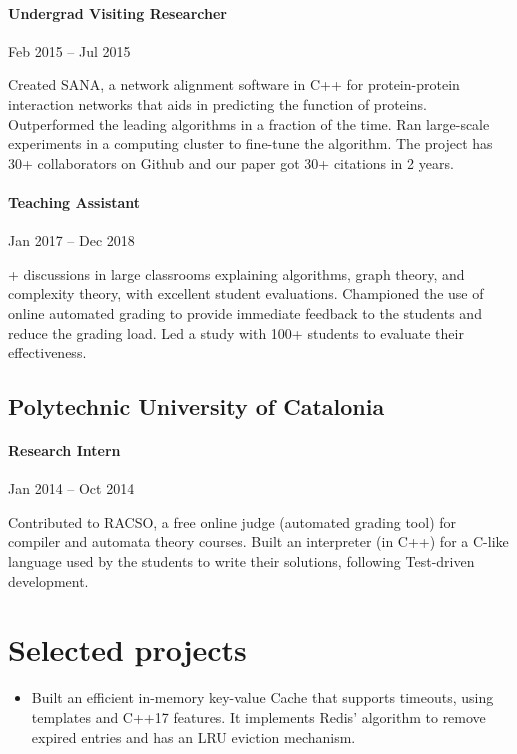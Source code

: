 \documentclass[letterpaper,10pt,oneside]{article}
\begin{document}
\paragraph*{Undergrad Visiting Researcher} \hfill Feb 2015 -- Jul 2015

\vspace{2px}
\noindent Created SANA, a network alignment software in C++ for protein-protein interaction networks that aids in predicting the function of proteins. Outperformed the leading algorithms in a fraction of the time. Ran
	large-scale experiments in a computing cluster to fine-tune the algorithm.
	The project has 30+ collaborators on Github and our paper got 30+ citations in 2 years.	
	 
\paragraph*{Teaching Assistant} \hfill Jan 2017 -- Dec 2018

\vspace{2px}
+ discussions in large classrooms explaining algorithms, graph theory, and complexity theory, with excellent student evaluations. Championed the use of online automated grading to provide immediate feedback to the students and reduce the grading load. Led a study with 100+ students to evaluate their effectiveness.
\vspace{3px}
\subsection*{Polytechnic University of Catalonia}
\vspace{-2px}
\paragraph*{Research Intern} \hfill Jan 2014 -- Oct 2014

\vspace{2px}
\noindent Contributed to RACSO, a free online judge (automated grading tool) for compiler and automata theory courses. Built an interpreter (in C++) for a C-like language used by the students to write their solutions, following Test-driven development.

\section*{Selected projects}
\begin{itemize}[leftmargin=15px]
	\item Built an efficient in-memory key-value Cache that supports timeouts, using templates and C++17 features. It implements Redis' algorithm to remove expired entries and has an LRU eviction mechanism.
\end{itemize}
\end{document}

